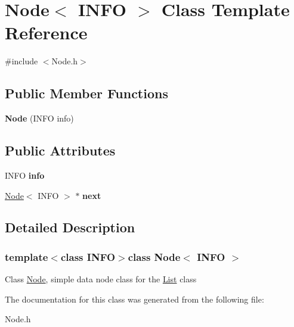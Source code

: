 \hypertarget{class_node}{\section{Node$<$ I\-N\-F\-O $>$ Class Template Reference}
\label{class_node}
}


{\ttfamily \#include $<$Node.\-h$>$}

\subsection*{Public Member Functions}
\begin{DoxyCompactItemize}
\item 
\hypertarget{class_node_a2b3d30cc34b4a4cad016522ee5266c47}{{\bfseries Node} (I\-N\-F\-O info)}\label{class_node_a2b3d30cc34b4a4cad016522ee5266c47}

\end{DoxyCompactItemize}
\subsection*{Public Attributes}
\begin{DoxyCompactItemize}
\item 
\hypertarget{class_node_a4b689df2425ba17ade3a920fd993f7b0}{I\-N\-F\-O {\bfseries info}}\label{class_node_a4b689df2425ba17ade3a920fd993f7b0}

\item 
\hypertarget{class_node_a843a1f2c5c368defc9c6090fd8777efd}{\hyperlink{class_node}{Node}$<$ I\-N\-F\-O $>$ $\ast$ {\bfseries next}}\label{class_node_a843a1f2c5c368defc9c6090fd8777efd}

\end{DoxyCompactItemize}


\subsection{Detailed Description}
\subsubsection*{template$<$class I\-N\-F\-O$>$class Node$<$ I\-N\-F\-O $>$}

Class \hyperlink{class_node}{Node}, simple data node class for the \hyperlink{class_list}{List} class 

The documentation for this class was generated from the following file\-:\begin{DoxyCompactItemize}
\item 
Node.\-h\end{DoxyCompactItemize}
